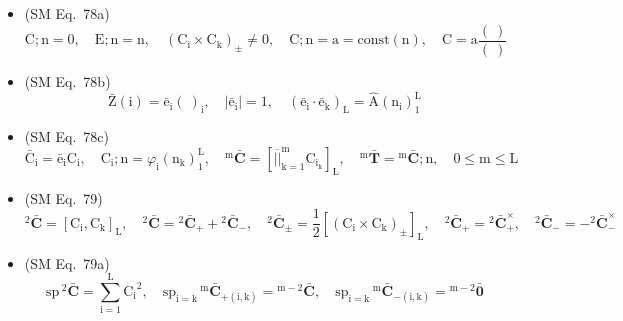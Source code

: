 \documentclass[12pt]{article}
\begin{document}
\begin{itemize}[label={},leftmargin=0pt]
    \item (SM Eq.\ 78a) 
    \[
    \mathrm{C};\mathrm{n} = 0, \quad \mathrm{E};\mathrm{n} = \mathrm{n}, \quad (\mathrm{C_i} \times \mathrm{C_k})_\pm \ne 0, \quad \mathrm{C};\mathrm{n} = \mathrm{a} = \mathrm{const}(\mathrm{n}), \quad \mathrm{C} = \mathrm{a} \frac{(\ )}{(\ )}
    \]

    \item (SM Eq.\ 78b) 
    \[
    \bar{\mathrm{Z}}(\mathrm{i}) = \bar{\mathrm{e}}_\mathrm{i} (\ )_\mathrm{i}, \quad |\bar{\mathrm{e}}_\mathrm{i}| = 1, \quad (\bar{\mathrm{e}}_\mathrm{i} \cdot \bar{\mathrm{e}}_\mathrm{k})_\mathrm{L} = \hat{\mathrm{A}}(\mathrm{n_i})_1^\mathrm{L}
    \]

    \item (SM Eq.\ 78c) 
    \[
    \bar{\mathrm{C}}_\mathrm{i} = \bar{\mathrm{e}}_\mathrm{i} \mathrm{C_i}, \quad \mathrm{C_i};\mathrm{n} = \varphi_\mathrm{i}(\mathrm{n_k})_1^\mathrm{L}, \quad {}^\mathrm{m}\bar{\mathbf{C}} = \left[ \overline{||}_{\mathrm{k}=1}^\mathrm{m} \mathrm{C}_{\mathrm{i_k}} \right]_\mathrm{L}, \quad {}^\mathrm{m}\bar{\mathbf{T}} = {}^\mathrm{m}\bar{\mathbf{C}};\mathrm{n}, \quad 0 \le \mathrm{m} \le \mathrm{L}
    \]

    \item (SM Eq.\ 79) 
    \[
    {}^2\bar{\mathbf{C}} = [\mathrm{C_i}, \mathrm{C_k}]_\mathrm{L}, \quad {}^2\bar{\mathbf{C}} = {}^2\bar{\mathbf{C}}_+ + {}^2\bar{\mathbf{C}}_-, \quad {}^2\bar{\mathbf{C}}_\pm = \frac{1}{2}\left[ (\mathrm{C_i} \times \mathrm{C_k})_\pm \right]_\mathrm{L}, \quad {}^2\bar{\mathbf{C}}_+ = {}^2\bar{\mathbf{C}}_+^\times, \quad {}^2\bar{\mathbf{C}}_- = -{}^2\bar{\mathbf{C}}_-^\times
    \]

    \item (SM Eq.\ 79a) 
    \[
    \mathrm{sp}\,{}^2\bar{\mathbf{C}} = \sum_{\mathrm{i}=1}^\mathrm{L} \mathrm{C_i}^2, \quad \mathrm{sp}_{\mathrm{i=k}}\,{}^\mathrm{m}\bar{\mathbf{C}}_{+(\mathrm{i,k})} = {}^{\mathrm{m}-2}\bar{\mathbf{C}}, \quad \mathrm{sp}_{\mathrm{i=k}}\,{}^\mathrm{m}\bar{\mathbf{C}}_{-(\mathrm{i,k})} = {}^{\mathrm{m}-2}\bar{\mathbf{0}}
    \]


\end{itemize}
\end{document}
